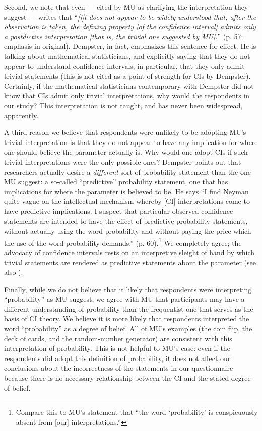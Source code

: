 \documentclass[jou,a4paper,floatsintext,draftfirst]{apa6}\usepackage[]{graphicx}\usepackage[]{color}
\begin{document}
Second, we note that even \citet{Dempster:1964} --- cited by MU as clarifying the interpretation they suggest --- writes that ``{\em [i]t does not appear to be widely understood that, after the observation is taken, the defining property [of the confidence interval] admits only a postdictive interpretation [that is, the trivial one suggested by MU].}'' (p. 57; emphasis in original). Dempster, in fact, emphasizes this sentence for effect. He is talking about mathematical statisticians, and explicitly saying that they do not appear to understand confidence intervals; in particular, that they only admit trivial statements (this is not cited as a point of strength for CIs by Dempster). Certainly, if the mathematical statisticians contemporary with Dempster did not know that CIs admit only trivial interpretations, why would the respondents in our study? This interpretation is not taught, and has never been widespread, apparently.

A third reason we believe that respondents were unlikely to be adopting MU's trivial interpretation is that they do not appear to have any implication for where one should believe the parameter actually is. Why would one adopt CIs if such trivial interpretations were the only possible ones? Dempster points out that researchers actually desire a {\em different} sort of probability statement than the one MU suggest: a so-called ``predictive'' probability statement, one that has implications for where the parameter is believed to be. He says ``I find Neyman quite vague on the intellectual mechanism whereby [CI] interpretations come to have predictive implications. I suspect that particular observed confidence statements are intended to have the effect of predictive probability statements, without actually using the word probability and without paying the price which the use of the word probability demands.''  (p. 60).\footnote{Compare this to MU's statement that ``the word `probability' is conspicuously absent from [our] interpretations.''} We completely agree; the advocacy of confidence intervals rests on an interpretive sleight of hand by which trivial statements are rendered as predictive statements about the parameter (see also \citet{Morey:etal:unpublished}).

Finally, while we do not believe that it likely that respondents were interpreting ``probability'' as MU suggest, we agree with MU that participants may have a different understanding of probability than the frequentist one that serves as the basis of CI theory. We believe it is more likely that respondents interpreted the word ``probability'' as a degree of belief. All of MU's examples (the coin flip, the deck of cards, and the random-number generator) are consistent with this interpretation of probability. This is not helpful to MU's case: even if the respondents did adopt this definition of probability, it does not affect our conclusions about the incorrectness of the statements in our questionnaire because there is no necessary relationship between the CI and the stated degree of belief.	
\end{document}
